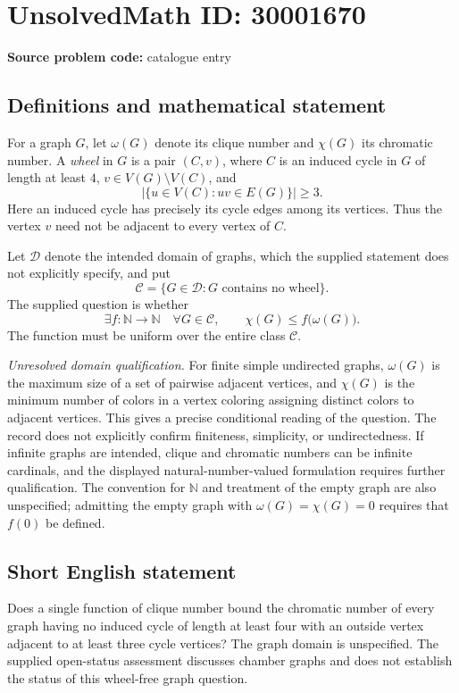 \documentclass[11pt]{article}
\newcommand{\N}{\mathbb{N}}
\begin{document}
\section*{UnsolvedMath ID: 30001670}
\textbf{Source problem code:} catalogue entry
\subsection{Definitions and mathematical statement}
For a graph \(G\), let \(\omega(G)\) denote its clique number and \(\chi(G)\) its chromatic number. A \emph{wheel} in \(G\) is a pair \((C,v)\), where \(C\) is an induced cycle in \(G\) of length at least \(4\), \(v\in V(G)\setminus V(C)\), and
\[
\bigl|\{u\in V(C): uv\in E(G)\}\bigr|\geq 3.
\]
Here an induced cycle has precisely its cycle edges among its vertices. Thus the vertex \(v\) need not be adjacent to every vertex of \(C\).

Let \(\mathcal D\) denote the intended domain of graphs, which the supplied statement does not explicitly specify, and put
\[
\mathcal C=\{G\in\mathcal D: G\text{ contains no wheel}\}.
\]
The supplied question is whether
\[
\exists f:\N\to\N\quad\forall G\in\mathcal C,\qquad
\chi(G)\leq f\bigl(\omega(G)\bigr).
\]
The function must be uniform over the entire class \(\mathcal C\).

\emph{Unresolved domain qualification.} For finite simple undirected graphs, \(\omega(G)\) is the maximum size of a set of pairwise adjacent vertices, and \(\chi(G)\) is the minimum number of colors in a vertex coloring assigning distinct colors to adjacent vertices. This gives a precise conditional reading of the question. The record does not explicitly confirm finiteness, simplicity, or undirectedness. If infinite graphs are intended, clique and chromatic numbers can be infinite cardinals, and the displayed natural-number-valued formulation requires further qualification. The convention for \(\N\) and treatment of the empty graph are also unspecified; admitting the empty graph with \(\omega(G)=\chi(G)=0\) requires that \(f(0)\) be defined.
\subsection{Short English statement}
Does a single function of clique number bound the chromatic number of every graph having no induced cycle of length at least four with an outside vertex adjacent to at least three cycle vertices? The graph domain is unspecified. The supplied open-status assessment discusses chamber graphs and does not establish the status of this wheel-free graph question.
\end{document}
